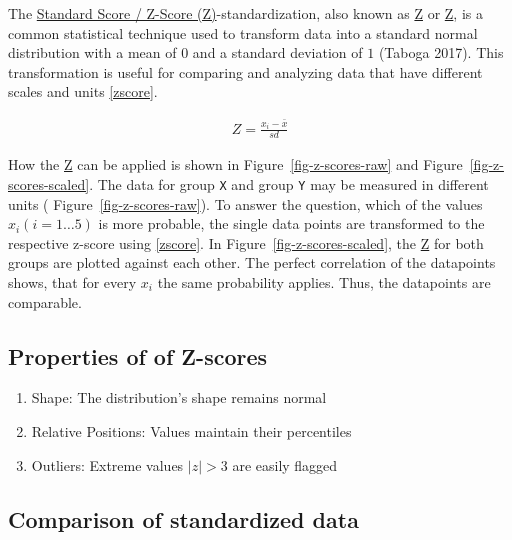 \documentclass[
  a4paper,
]{scrbook}
\providecommand{\tightlist}{%
  \setlength{\itemsep}{0pt}\setlength{\parskip}{0pt}}\usepackage{longtable,booktabs,array}
\begin{document}
The \hyperref[acronyms_Z]{Standard Score / Z-Score (Z)}-standardization,
also known as \hyperref[acronyms_Z]{Z} or \hyperref[acronyms_Z]{Z}, is a
common statistical technique used to transform data into a standard
normal distribution with a mean of \(0\) and a standard deviation of
\(1\) (Taboga 2017). This transformation is useful for comparing and
analyzing data that have different scales and units \eqref{zscore}.

\begin{align}
Z = \frac{x_i - \bar{x}}{sd} \label{zscore}
\end{align}

How the \hyperref[acronyms_Z]{Z} can be applied is shown in
Figure~\ref{fig-z-scores-raw} and Figure~\ref{fig-z-scores-scaled}. The
data for group \texttt{X} and group \texttt{Y} may be measured in
different units ( Figure~\ref{fig-z-scores-raw}). To answer the
question, which of the values \(x_i (i=1\ldots5)\) is more probable, the
single data points are transformed to the respective z-score using
\eqref{zscore}. In Figure~\ref{fig-z-scores-scaled}, the
\hyperref[acronyms_Z]{Z} for both groups are plotted against each other.
The perfect correlation of the datapoints shows, that for every \(x_i\)
the same probability applies. Thus, the datapoints are comparable.

\subsection{Properties of of Z-scores}\label{properties-of-of-z-scores}

\begin{enumerate}
\def\labelenumi{\arabic{enumi}.}
\tightlist
\item
  Shape: The distribution's shape remains normal
\item
  Relative Positions: Values maintain their percentiles
\item
  Outliers: Extreme values \(|z|>3\) are easily flagged
\end{enumerate}

\subsection{Comparison of standardized
data}\label{comparison-of-standardized-data}
\end{document}
